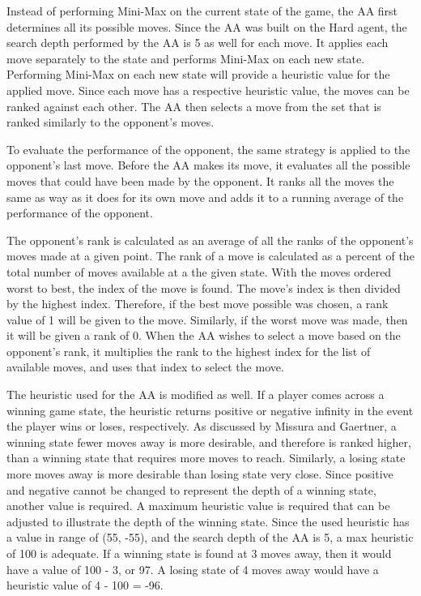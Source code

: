 \documentclass[12pt]{article}
\begin{document}
Instead of performing Mini-Max on the current state of the game, the AA first determines all its possible moves. Since the AA was built on the Hard agent, the search depth performed by the AA is 5 as well for each move. It applies each move separately to the state and performs Mini-Max on each new state. Performing Mini-Max on each new state will provide a heuristic value for the applied move. Since each move has a respective heuristic value, the moves can be ranked against each other. The AA then selects a move from the set that is ranked similarly to the opponent's moves.

To evaluate the performance of the opponent, the same strategy is applied to the opponent's last move. Before the AA makes its move, it evaluates all the possible moves that could have been made by the opponent. It ranks all the moves the same as way as it does for its own move and adds it to a running average of the performance of the opponent.

The opponent's rank is calculated as an average of all the ranks of the opponent's moves made at a given point. The rank of a move is calculated as a percent of the total number of moves available at a the given state. With the moves ordered worst to best, the index of the move is found. The move's index is then divided by the highest index. Therefore, if the best move possible was chosen, a rank value of 1 will be given to the move. Similarly, if the worst move was made, then it will be given a rank of 0. When the AA wishes to select a move based on the opponent's rank, it multiplies the rank to the highest index for the list of available moves, and uses that index to select the move.

The heuristic used for the AA is modified as well. If a player comes across a winning game state, the heuristic returns positive or negative infinity in the event the player wins or loses, respectively. As discussed by Missura and Gaertner, a winning state fewer moves away is more desirable, and therefore is ranked higher, than a winning state that requires more moves to reach. Similarly, a losing state more moves away is more desirable than losing state very close. Since positive and negative cannot be changed to represent the depth of a winning state, another value is required. A maximum heuristic value is required that can be adjusted to illustrate the depth of the winning state. Since the used heuristic has a value in range of (55, -55), and the search depth of the AA is 5, a max heuristic of 100 is adequate. If a winning state is found at 3 moves away, then it would have a value of 100 - 3, or 97. A losing state of 4 moves away would have a heuristic value of 4 - 100 = -96.
\end{document}
